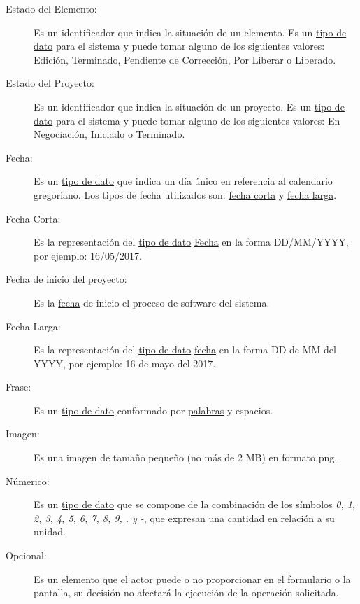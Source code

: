 \begin{description}
	\item[\hypertarget{tEdoElem}{Estado del Elemento:}] Es un identificador que indica la situación de un elemento. Es un \hyperlink{tTipoDato}{tipo de dato} para el sistema y puede tomar alguno de los siguientes valores: Edición, Terminado, Pendiente de Corrección, Por Liberar o Liberado.
	
	\item[\hypertarget{tEdoProy}{Estado del Proyecto:}] Es un identificador que indica la situación de un proyecto. Es un \hyperlink{tTipoDato}{tipo de dato} para el sistema y puede tomar alguno de los siguientes valores: En Negociación, Iniciado o Terminado.
	
	\item[\hypertarget{tFecha}{Fecha:}] Es un \hyperlink{tTipoDato}{tipo de dato} que indica un día único en referencia al calendario gregoriano. Los tipos de fecha utilizados son: \hyperlink{tFechaCorta}{fecha corta} y \hyperlink{tFechaLarga}{fecha larga}.
	
	\item[\hypertarget{tFechaCorta}{Fecha Corta:}] Es la representación del \hyperlink{tTipoDato}{tipo de dato} \hyperlink{tFecha}{Fecha} en la forma DD/MM/YYYY, por ejemplo: 16/05/2017.
	
	\item[\hypertarget{tFechaInitPro}{Fecha de inicio del proyecto:}] Es la \hyperlink{tFecha}{fecha} de inicio el proceso de software del sistema.
	
	\item[\hypertarget{tFechaLarga}{Fecha Larga:}] Es la representación del \hyperlink{tTipoDato}{tipo de dato} \hyperlink{tFecha}{fecha} en la forma DD de MM del YYYY, por ejemplo: 16 de mayo del 2017.
	
	\item[\hypertarget{tFrase}{Frase:}] Es un \hyperlink{tTipoDato}{tipo de dato} conformado por \hyperlink{tPalabra}{palabras} y espacios.
	
	\item[\hypertarget{tImagen}{Imagen:}] Es una imagen de tamaño pequeño (no más de 2 MB) en formato png.
	
	\item[\hypertarget{tNumerico}{Númerico:}] Es un \hyperlink{tTipoDato}{tipo de dato} que se compone de la combinación de los símbolos {\em 0, 1, 2, 3, 4, 5, 6, 7, 8, 9, . y -}, que expresan una cantidad en relación a su unidad.
	
	\item[\hypertarget{tOpcional}{Opcional:}] Es un elemento que el actor puede o no proporcionar en el formulario o la pantalla, su decisión no afectará la ejecución de la operación solicitada.
	

\end{description}
